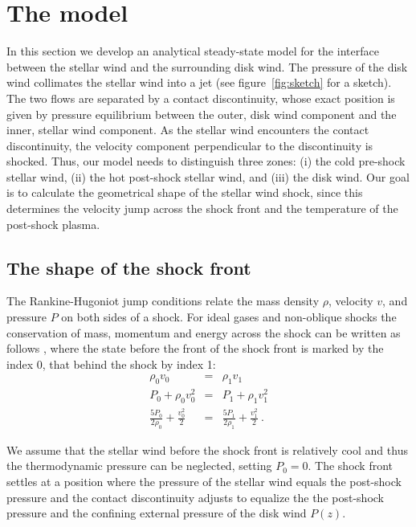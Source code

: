 \section{The model}

In this section we develop an analytical steady-state model for the interface between the stellar wind and the surrounding disk wind. The pressure of the disk wind collimates the stellar wind into a jet (see figure~\ref{fig:sketch} for a sketch). The two flows are separated by a contact discontinuity, whose exact position is given by pressure equilibrium between the outer, disk wind component and the inner, stellar wind component. As the stellar wind encounters the contact discontinuity, the velocity component perpendicular to the discontinuity is shocked. Thus, our model needs to distinguish three zones: (i) the cold pre-shock stellar wind, (ii) the hot post-shock stellar wind, and (iii) the disk wind. Our goal is to calculate the geometrical shape of the stellar wind shock, since this determines the velocity jump across the shock front and the temperature of the post-shock plasma. 

\subsection{The shape of the shock front}
\label{sect:model}
The Rankine-Hugoniot jump conditions relate the mass density $\rho$, velocity $v$, and pressure $P$ on both sides of a shock. For ideal gases and non-oblique shocks the conservation of mass, momentum and energy across the shock can be written as follows \citep[][chap.~7]{1967pswh.book.....Z}, where the state before the front of the shock front is marked by the index 0, that behind the shock by index 1:
\begin{eqnarray}
\rho_0 v_0 & = & \rho_1 v_1 \label{eqn:RH1}\\
\label{eqn:RH2}P_0+\rho_0 v_0^2 & = & P_1+\rho_1 v_1^2\\
\label{eqn:RH3}\frac{5 P_0}{2\rho_0}+\frac{v_0^2}{2}& = &\frac{5 P_1}{2\rho_1}+\frac{v_1^2}{2} \ .
\end{eqnarray}

We assume that the stellar wind before the shock front is relatively cool and thus the thermodynamic pressure can be neglected, setting $P_0=0$.
The shock front settles at a position where the pressure of the stellar wind equals the post-shock pressure and the contact discontinuity adjusts to equalize the the post-shock pressure and the confining external pressure of the disk wind $P(z)$. 

